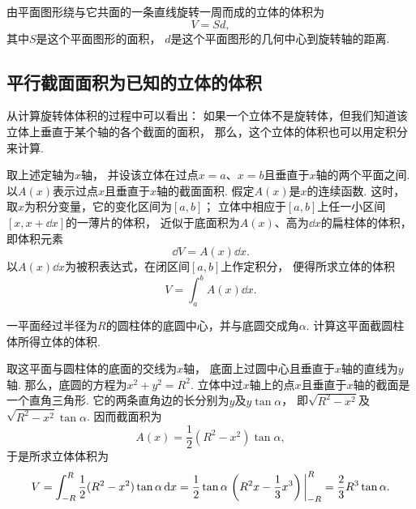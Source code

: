 \begin{theorem}[古尔丁体积定理]
由平面图形绕与它共面的一条直线旋转一周而成的立体的体积为\begin{equation}
	V = S d,
\end{equation}
其中\(S\)是这个平面图形的面积，
\(d\)是这个平面图形的几何中心到旋转轴的距离.
\end{theorem}

\subsection{平行截面面积为已知的立体的体积}
从计算旋转体体积的过程中可以看出：
如果一个立体不是旋转体，但我们知道该立体上垂直于某个轴的各个截面的面积，
那么，这个立体的体积也可以用定积分来计算.

取上述定轴为\(x\)轴，
并设该立体在过点\(x=a\)、\(x=b\)且垂直于\(x\)轴的两个平面之间.
以\(A(x)\)表示过点\(x\)且垂直于\(x\)轴的截面面积.
假定\(A(x)\)是\(x\)的连续函数.
这时，取\(x\)为积分变量，它的变化区间为\([a,b]\)；
立体中相应于\([a,b]\)上任一小区间\([x,x+\dd{x}]\)的一薄片的体积，
近似于底面积为\(A(x)\)、高为\(\dd{x}\)的扁柱体的体积，
即体积元素\begin{equation*}
	\dd{V} = A(x) \dd{x}.
\end{equation*}
以\(A(x) \dd{x}\)为被积表达式，在闭区间\([a,b]\)上作定积分，
便得所求立体的体积\begin{equation*}
	V = \int_a^b A(x) \dd{x}.
\end{equation*}

\begin{example}
一平面经过半径为\(R\)的圆柱体的底圆中心，并与底圆交成角\(\alpha\).
计算这平面截圆柱体所得立体的体积.
\begin{solution}
取这平面与圆柱体的底面的交线为\(x\)轴，
底面上过圆中心且垂直于\(x\)轴的直线为\(y\)轴.
那么，底圆的方程为\(x^2+y^2=R^2\).
立体中过\(x\)轴上的点\(x\)且垂直于\(x\)轴的截面是一个直角三角形.
它的两条直角边的长分别为\(y\)及\(y \tan\alpha\)，
即\(\sqrt{R^2-x^2}\)及\(\sqrt{R^2-x^2} \tan\alpha\).
因而截面积为\begin{equation*}
	A(x) = \frac12 (R^2-x^2) \tan\alpha,
\end{equation*}
于是所求立体体积为\begin{equation*}
	V = \int_{-R}^R \frac12 (R^2-x^2) \tan\alpha \dd{x}
	= \frac12 \tan\alpha \eval{\left(R^2x-\frac13x^3\right)}_{-R}^R
	= \frac23 R^3 \tan\alpha.
\end{equation*}
\end{solution}
\end{example}

